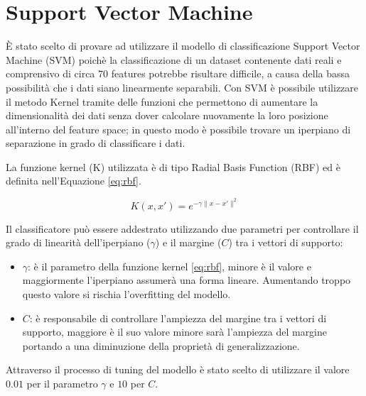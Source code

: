 \section{Support Vector Machine}
È stato scelto di provare ad utilizzare il modello di classificazione 
Support Vector Machine (SVM) poichè la classificazione di un dataset contenente 
dati reali e comprensivo di circa 70 features potrebbe risultare difficile, a 
causa della bassa possibilità che i dati siano linearmente separabili. 
Con SVM è possibile utilizzare il metodo Kernel tramite delle funzioni 
che permettono di aumentare la dimensionalità dei dati senza dover 
calcolare nuovamente la loro posizione all'interno del feature space; in questo 
modo è possibile trovare un iperpiano di separazione in grado di classificare 
i dati.

La funzione kernel (K) utilizzata è di tipo 
Radial Basis Function (RBF) ed è definita nell'Equazione \ref{eq:rbf}.

\begin{equation}\label{eq:rbf}
    K(x, x') = e^{- \gamma \|x - x'\|^2}
\end{equation}

Il classificatore può essere addestrato utilizzando due parametri per 
controllare il grado di linearità dell'iperpiano ($\gamma$) e il margine ($C$) 
tra i vettori di supporto:

\begin{itemize}
    \item $\gamma$: è il parametro della funzione kernel \ref{eq:rbf}, minore è 
    il valore e maggiormente l'iperpiano assumerà una forma lineare. 
    Aumentando troppo questo valore si rischia l'overfitting del modello.
    \item $C$: è responsabile di controllare l'ampiezza del margine tra i 
    vettori di supporto, maggiore è il suo valore minore sarà l'ampiezza del 
    margine portando a una diminuzione della proprietà di generalizzazione.
\end{itemize}

Attraverso il processo di tuning del modello è stato scelto di utilizzare il 
valore $0.01$ per il parametro $\gamma$ e $10$ per $C$.
